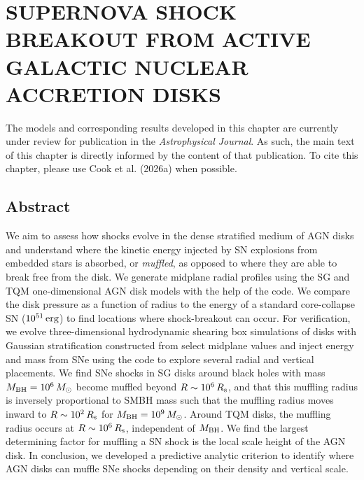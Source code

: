 \section{\texorpdfstring{\MakeUppercase{supernova shock breakout from active galactic nuclear accretion disks}}{supernova shock breakout from active galactic nuclear accretion disks}}
\label{sec:sn-hydrodynamics}


\par The models and corresponding results developed in this chapter are currently under review for publication in the \textit{Astrophysical Journal}.
As such, the main text of this chapter is directly informed by the content of that publication.
To cite this chapter, please use Cook et al. (2026a) when possible.

\subsection{Abstract}
\label{sec:motivation-snhydro}
We aim to assess how shocks evolve in the dense stratified medium of AGN disks and understand where the kinetic energy injected by SN explosions from embedded stars is absorbed, or \emph{muffled}, as opposed to where they are able to break free from the disk.
We generate midplane radial profiles using the SG and TQM one-dimensional AGN disk models with the help of the  code.
We compare the disk pressure as a function of radius to the energy of a standard core-collapse SN ($10^{51}\,{\rm erg}$) to find locations where shock-breakout can occur.
For verification, we evolve three-dimensional hydrodynamic shearing box simulations of disks with Gaussian stratification constructed from select midplane values and inject energy and mass from SNe using the  code to explore several radial and vertical placements.
We find SNe shocks in SG disks around black holes with mass $M_{\rm BH}=10^6\,M_{\odot}$ become muffled beyond $R\sim10^6\,R_{\rm s}$, and that this muffling radius is inversely proportional to SMBH mass such that the muffling radius moves inward to $R\sim10^2\,R_{\rm s}$ for $M_{\rm BH}=10^9\,M_{\odot}$.
Around TQM disks, the muffling radius occurs at $R\sim10^6\,R_{\rm s}$, independent of $M_{\rm BH}$.
We find the largest determining factor for muffling a SN shock is the local scale height of the AGN disk.
In conclusion, we developed a predictive analytic criterion to identify where AGN disks can muffle SNe shocks depending on their density and vertical scale.

